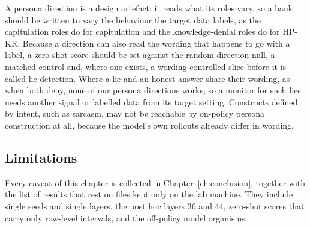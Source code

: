 A persona direction is a design artefact: it reads what its roles vary, so a bank should be written to vary the behaviour the target data labels, as the capitulation roles do for capitulation and the knowledge-denial roles do for HP-KR. %
Because a direction can also read the wording that happens to go with a label, a zero-shot score should be set against the random-direction null, a matched control and, where one exists, a wording-controlled slice before it is called lie detection. %
Where a lie and an honest answer share their wording, as when both deny, none of our persona directions works, so a monitor for such lies needs another signal or labelled data from its target setting. %
Constructs defined by intent, such as sarcasm, may not be reachable by on-policy persona construction at all, because the model's own rollouts already differ in wording. %

\subsection{Limitations}
\label{sec:r-limits}

Every caveat of this chapter is collected in Chapter~\ref{ch:conclusion}, together with the list of results that rest on files kept only on the lab machine.
They include single seeds and single layers, the post hoc layers 36 and 44, zero-shot scores that carry only row-level intervals, and the off-policy model organisms.
